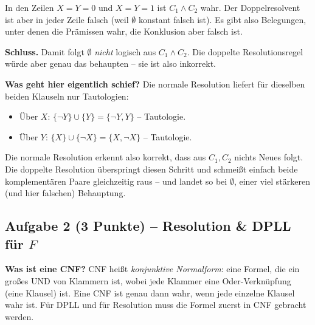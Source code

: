 \documentclass[a4paper,12pt]{article}
\begin{document}
In den Zeilen $X = Y = 0$ und $X = Y = 1$ ist $C_1 \wedge C_2$ wahr. Der
Doppelresolvent ist aber in jeder Zeile falsch (weil $\emptyset$ konstant
falsch ist). Es gibt also Belegungen, unter denen die Pr\"amissen wahr,
die Konklusion aber falsch ist.

\medskip
\textbf{Schluss.}
Damit folgt $\emptyset$ \emph{nicht} logisch aus $C_1 \wedge C_2$. Die
doppelte Resolutionsregel w\"urde aber genau das behaupten -- sie ist also
inkorrekt.

\medskip
\textbf{Was geht hier eigentlich schief?}
Die normale Resolution liefert f\"ur dieselben beiden Klauseln nur
Tautologien:
\begin{itemize}[nosep]
\item \"Uber $X$: $\{\neg Y\} \cup \{Y\} = \{\neg Y, Y\}$ -- Tautologie.
\item \"Uber $Y$: $\{X\} \cup \{\neg X\} = \{X, \neg X\}$ -- Tautologie.
\end{itemize}
Die normale Resolution erkennt also korrekt, dass aus $C_1, C_2$ nichts
Neues folgt. Die doppelte Resolution \"uberspringt diesen Schritt und
schmei\ss t einfach beide komplement\"aren Paare gleichzeitig raus -- und
landet so bei $\emptyset$, einer viel st\"arkeren (und hier falschen)
Behauptung.

\medskip
\noindent{}

\newpage

\subsection*{Aufgabe 2 \textnormal{(3 Punkte)} -- Resolution \& DPLL f\"ur $F$}

\textbf{Was ist eine CNF?}
CNF hei\ss t \emph{konjunktive Normalform}: eine Formel, die ein gro\ss es
UND von Klammern ist, wobei jede Klammer eine Oder-Verkn\"upfung
(eine Klausel) ist. Eine CNF ist genau dann wahr, wenn jede einzelne
Klausel wahr ist. F\"ur DPLL und f\"ur Resolution muss die Formel zuerst in
CNF gebracht werden.
\end{document}
